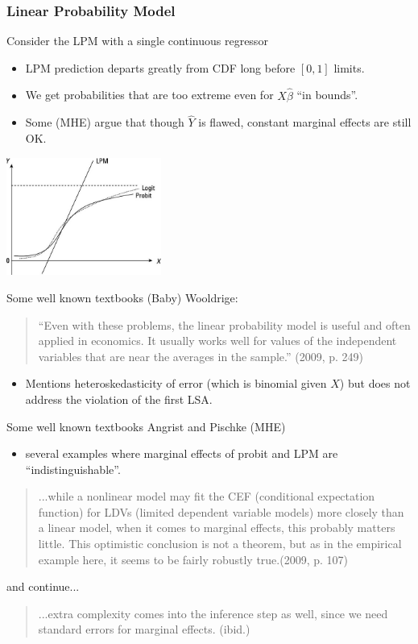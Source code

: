 \documentclass[aspectratio=169]{beamer}
\begin{document}
\begin{frame}
\frametitle{Linear Probability Model}
Consider the LPM with a single continuous regressor
\begin{itemize}
\item LPM prediction departs greatly from CDF long before $[0,1]$ limits.
\item We get probabilities that are too extreme even for $X\hat{\beta}$ ``in bounds''.
\item Some (MHE) argue that though $\hat{Y}$ is flawed, constant marginal effects are still OK.
\end{itemize}
\begin{center}
\includegraphics[width=2in]{resources/lpm-probit.jpg}
\end{center}
\end{frame}

\begin{frame}{Some well known textbooks}
(Baby) Wooldrige:
\begin{quote}
``Even with these problems, the linear probability model is useful and often applied in economics. It usually works well for values of the independent variables that are near the averages in the sample.'' (2009, p. 249)
\end{quote}
\begin{itemize}
\item Mentions heteroskedasticity of error (which is binomial given $X$) but does not address the violation of the first LSA.
\end{itemize}
\end{frame}

\begin{frame}{Some well known textbooks}
Angrist and Pischke (MHE) 
\begin{itemize}
\item several examples where marginal effects of probit and LPM are ``indistinguishable''.
\end{itemize}

\begin{quote}
...while a nonlinear model may fit the CEF (conditional expectation function) for LDVs (limited dependent variable models) more closely than a linear model, when it comes to marginal effects, this probably matters little. This optimistic conclusion is not a theorem, but as in the empirical example here, it seems to be fairly robustly true.(2009, p. 107)
\end{quote}
and continue...
\begin{quote}
...extra complexity comes into the inference step as well, since we need standard errors for marginal effects. (ibid.)
\end{quote}
\end{frame}
\end{document}
